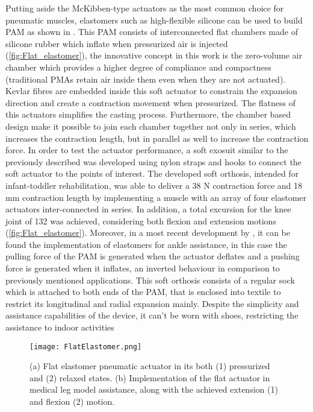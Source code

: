 Putting aside the McKibben-type actuators as the most common choice for pneumatic muscles, elastomers such as high-flexible silicone can be used to build PAM as shown in \cite{Park2014}. This PAM consists of interconnected flat chambers made of silicone rubber which inflate when pressurized air is injected (\autoref{fig:Flat_elastomer}), the innovative concept in this work is the zero-volume air chamber which provides a higher degree of compliance and compactness (traditional PMAs retain air inside them even when they are not actuated). Kevlar fibres are embedded inside this soft actuator to constrain the expansion direction and create a contraction movement when pressurized. The flatness of this actuators simplifies the casting process. Furthermore, the chamber based design make it possible to join each chamber together not only in series, which increases the contraction length, but in parallel as well to increase the contraction force. In order to test the actuator performance, a soft exosuit similar to the previously described was developed using nylon straps and hooks to connect the soft actuator to the points of interest. The developed soft orthosis, intended for infant-toddler rehabilitation, was able to deliver a 38 N contraction force and 18 mm contraction length by implementing a muscle with an array of four elastomer actuators inter-connected in series. In addition, a total excursion for the knee joint of 132\textdegree{} was achieved, considering both flexion and extension motions (\autoref{fig:Flat_elastomer}). Moreover, in a most recent development by \cite{Low2016}, it can be found the implementation of elastomers for ankle assistance, in this case the pulling force of the PAM is generated when the actuator deflates and a pushing force is generated when it inflates, an inverted behaviour in comparison to previously mentioned applications. This soft orthosis consists of a regular sock which is attached to both ends of the PAM, that is enclosed into textile to restrict its longitudinal and radial expansion mainly. Despite the simplicity and assistance capabilities of the device, it can't be worn with shoes, restricting the assistance to indoor activities
\begin{figure}[hbtp!]
    \centering
    \texttt{[image: FlatElastomer.png]}
    \caption{(a) Flat elastomer pneumatic actuator in its both (1) pressurized and (2) relaxed states. (b) Implementation of the flat actuator in medical leg model assistance, along with the achieved extension (1) and flexion (2) motion. \cite{Park2014} }
    \label{fig:Flat_elastomer}
\end{figure}

